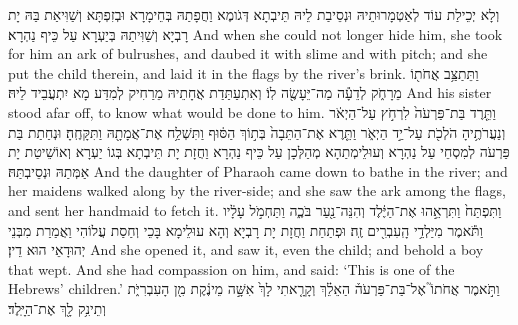 {וְלָא יְכֵילַת עוֹד לְאַטְמָרוּתֵיהּ וּנְסֵיבַת לֵיהּ תֵּיבְתָא דְּגֹומֶא וַחֲפָתַהּ בְּחֵימָרָא וּבְזִפְתָּא וְשַׁוִּיאַת בַּהּ יָת רָבְיָא וְשַׁוִּיתַהּ בְּיַעְרָא עַל כֵּיף נַהְרָא׃}
{And when she could not longer hide him, she took for him an ark of bulrushes, and daubed it with slime and with pitch; and she put the child therein, and laid it in the flags by the river’s brink.}{}
{וַתֵּתַצַּ֥ב אֲחֹת֖וֹ מֵרָחֹ֑ק לְדֵעָ֕ה מַה־יֵּעָשֶׂ֖ה לֽוֹ׃}
{וְאִתְעַתַּדַת אֲחָתֵיהּ מֵרַחִיק לְמִדַּע מָא יִתְעֲבֵיד לֵיהּ׃}
{And his sister stood afar off, to know what would be done to him.}{}
{וַתֵּ֤רֶד בַּת־פַּרְעֹה֙ לִרְחֹ֣ץ עַל־הַיְאֹ֔ר וְנַעֲרֹתֶ֥יהָ הֹלְכֹ֖ת עַל־יַ֣ד הַיְאֹ֑ר וַתֵּ֤רֶא אֶת־הַתֵּבָה֙ בְּת֣וֹךְ הַסּ֔וּף וַתִּשְׁלַ֥ח אֶת־אֲמָתָ֖הּ וַתִּקָּחֶֽהָ׃
}
{וּנְחַתַת בַּת פַּרְעֹה לְמִסְחֵי עַל נַהְרָא וְעוּלֵימְתַהָא מְהַלְּכָן עַל כֵּיף נַהְרָא וַחֲזָת יָת תֵּיבְתָא בְּגוֹ יַעְרָא וְאוֹשֵׁיטַת יָת אַמְּתַהּ וּנְסֵיבְתַּהּ׃}
{And the daughter of Pharaoh came down to bathe in the river; and her maidens walked along by the river-side; and she saw the ark among the flags, and sent her handmaid to fetch it.}{}
{וַתִּפְתַּח֙ וַתִּרְאֵ֣הוּ אֶת־הַיֶּ֔לֶד וְהִנֵּה־נַ֖עַר בֹּכֶ֑ה וַתַּחְמֹ֣ל עָלָ֔יו וַתֹּ֕אמֶר מִיַּלְדֵ֥י הָֽעִבְרִ֖ים זֶֽה׃
}
{וּפְתַחַת וַחֲזָת יָת רָבְיָא וְהָא עוּלֵימָא בָּכֵי וְחַסַת עֲלוֹהִי וַאֲמַרַת מִבְּנֵי יְהוּדָאֵי הוּא דֵין׃}
{And she opened it, and saw it, even the child; and behold a boy that wept. And she had compassion on him, and said: ‘This is one of the Hebrews’ children.’}{}
{וַתֹּ֣אמֶר אֲחֹתוֹ֮ אֶל־בַּת־פַּרְעֹה֒ הַאֵלֵ֗ךְ וְקָרָ֤אתִי לָךְ֙ אִשָּׁ֣ה מֵינֶ֔קֶת מִ֖ן הָעִבְרִיֹּ֑ת וְתֵינִ֥ק לָ֖ךְ אֶת־הַיָּֽלֶד׃
}
